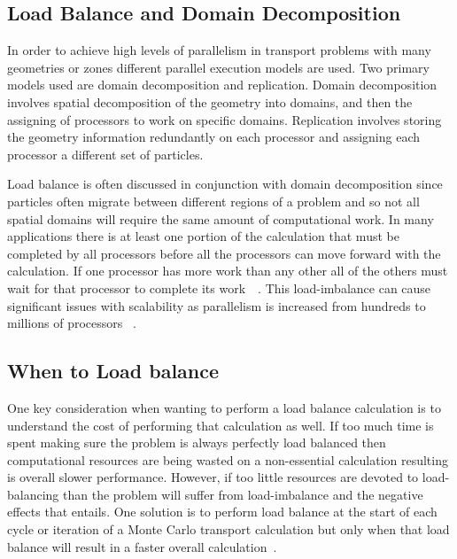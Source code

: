 \subsection{ \textbf{ Load Balance and Domain Decomposition} }

In order to achieve high levels of parallelism in transport problems with many geometries or zones different parallel execution models are used.
%
Two primary models used are domain decomposition and replication.
%
Domain decomposition involves spatial decomposition of the geometry into domains, and then the assigning of processors to work on specific domains.
%
Replication involves storing the geometry information redundantly on each processor and assigning each processor a different set of particles.
~\cite{procassini2005load}
~\cite{o2005dynamic}


Load balance is often discussed in conjunction with domain decomposition since particles often migrate between different regions of a problem and so not all spatial domains will require the same amount of computational work.
%
In many applications there is at least one portion of the calculation that must be completed by all processors before all the processors can move forward with the calculation.
%
If one processor has more work than any other all of the others must wait for that processor to complete its work~\cite{procassini2005load}~\cite{o2005dynamic}.
%
This load-imbalance can cause significant issues with scalability as parallelism is increased from hundreds to millions of processors ~\cite{o2013scalable}.
%

\subsection*{When to Load balance}

%
One key consideration when wanting to perform a load balance calculation is to understand the cost of performing that calculation as well.
%
If too much time is spent making sure the problem is always perfectly load balanced then computational resources are being wasted on a non-essential calculation resulting is overall slower performance.
%
However, if too little resources are devoted to load-balancing than the problem will suffer from load-imbalance and the negative effects that entails.
%
One solution is to perform load balance at the start of each cycle or iteration of a Monte Carlo transport calculation but only when that load balance will result in a faster overall calculation~\cite{o2005dynamic}.
%

